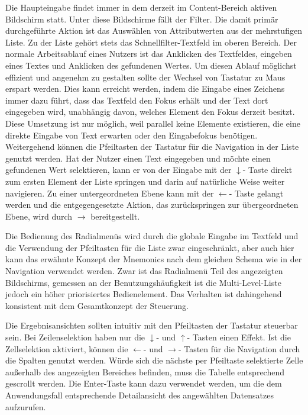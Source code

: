Die Haupteingabe findet immer in dem derzeit im Content-Bereich aktiven Bildschirm statt. Unter diese Bildschirme fällt der Filter. Die damit primär durchgeführte Aktion ist das Auswählen von Attributwerten aus der mehrstufigen Liste. Zu der Liste gehört stets das Schnellfilter-Textfeld im oberen Bereich. Der normale Arbeitsablauf eines Nutzers ist das Anklicken des Textfeldes, eingeben eines Textes und Anklicken des gefundenen Wertes. Um diesen Ablauf möglichst effizient und angenehm zu gestalten sollte der Wechsel von Tastatur zu Maus erspart werden. Dies kann erreicht werden, indem die Eingabe eines Zeichens immer dazu führt, dass das Textfeld den Fokus erhält und der Text dort eingegeben wird, unabhängig davon, welches Element den Fokus derzeit besitzt. Diese Umsetzung ist nur möglich, weil parallel keine Elemente existieren, die eine direkte Eingabe von Text erwarten oder den Eingabefokus benötigen. Weitergehend können die Pfeiltasten der Tastatur für die Navigation in der Liste genutzt werden. Hat der Nutzer einen Text eingegeben und möchte einen gefundenen Wert selektieren, kann er von der Eingabe mit der $\downarrow$- Taste direkt zum ersten Element der Liste springen und darin auf natürliche Weise weiter navigieren. Zu einer untergeordneten Ebene kann mit der $\leftarrow$- Taste gelangt werden und die entgegengesetzte Aktion, das zurückspringen zur übergeordneten Ebene, wird durch $\rightarrow$ bereitgestellt.\par
Die Bedienung des Radialmenüs wird durch die globale Eingabe im Textfeld und die Verwendung der Pfeiltasten für die Liste zwar eingeschränkt, aber auch hier kann das erwähnte Konzept der Mnemonics nach dem gleichen Schema wie in der Navigation verwendet werden. Zwar ist das Radialmenü Teil des angezeigten Bildschirms, gemessen an der Benutzungshäufigkeit ist die Multi-Level-Liste jedoch ein höher priorisiertes Bedienelement. Das Verhalten ist dahingehend konsistent mit dem Gesamtkonzept der Steuerung.\par
{}
Die Ergebnisansichten sollten intuitiv mit den Pfeiltasten der Tastatur steuerbar sein. Bei Zeilenselektion haben nur die $\downarrow$- und $\uparrow$- Tasten einen Effekt. Ist die Zellselektion aktiviert, können die $\leftarrow$- und $\rightarrow$- Tasten für die Navigation durch die Spalten genutzt werden. Würde sich die nächste per Pfeiltaste selektierte Zelle außerhalb des angezeigten Bereiches befinden, muss die Tabelle entsprechend gescrollt werden. Die Enter-Taste kann dazu verwendet werden, um die dem Anwendungsfall entsprechende Detailansicht des angewählten Datensatzes aufzurufen.\par
